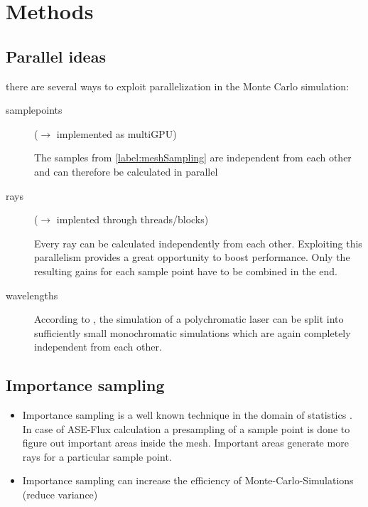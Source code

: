\section{Methods}
\subsection{Parallel ideas}

there are several ways to exploit parallelization in the Monte Carlo simulation:

\begin{description}

  \item[samplepoints] ($\rightarrow$ implemented as multiGPU)

    The samples from \ref{label:meshSampling} are independent from each other
    and can therefore be calculated in parallel

  \item[rays] ($\rightarrow$ implented through threads/blocks)
    
    Every ray can be calculated independently from each other.
    Exploiting this parallelism provides a great opportunity to boost
    performance. Only the resulting gains for each sample point have to be
    combined in the end.

  \item[wavelengths]

    According to \label{label:monteCarlo}, the simulation of a polychromatic
    laser can be split into sufficiently small monochromatic simulations which
    are again completely independent from each other.

\end{description}


\subsection{Importance sampling}
\begin{itemize}
\item Importance sampling is a well known technique in the domain
  of statistics \cite{importanceSampling}. In case of ASE-Flux calculation a presampling of
  a sample point is done to figure out important areas
  inside the mesh. Important areas generate more rays for a
  particular sample point.
\item Importance sampling can increase the efficiency of Monte-Carlo-Simulations (reduce variance)
\end{itemize}


